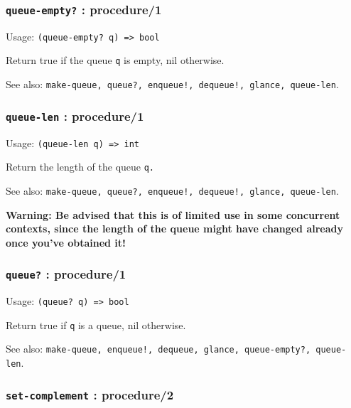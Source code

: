 \documentclass[
]{article}
\newcommand{\passthrough}[1]{#1}
\begin{document}
\hypertarget{queue-empty-procedure1}{%
\subsubsection{\texorpdfstring{\texttt{queue-empty?} :
procedure/1}{queue-empty? : procedure/1}}\label{queue-empty-procedure1}}

Usage: \passthrough{\lstinline!(queue-empty? q) => bool!}

Return true if the queue \passthrough{\lstinline!q!} is empty, nil
otherwise.

See also:
\passthrough{\lstinline"make-queue, queue?, enqueue!, dequeue!, glance, queue-len"}.

\hypertarget{queue-len-procedure1}{%
\subsubsection{\texorpdfstring{\texttt{queue-len} :
procedure/1}{queue-len : procedure/1}}\label{queue-len-procedure1}}

Usage: \passthrough{\lstinline!(queue-len q) => int!}

Return the length of the queue \passthrough{\lstinline!q.!}

See also:
\passthrough{\lstinline"make-queue, queue?, enqueue!, dequeue!, glance, queue-len"}.

\textbf{Warning: Be advised that this is of limited use in some
concurrent contexts, since the length of the queue might have changed
already once you've obtained it!}

\hypertarget{queue-procedure1}{%
\subsubsection{\texorpdfstring{\texttt{queue?} :
procedure/1}{queue? : procedure/1}}\label{queue-procedure1}}

Usage: \passthrough{\lstinline!(queue? q) => bool!}

Return true if \passthrough{\lstinline!q!} is a queue, nil otherwise.

See also:
\passthrough{\lstinline"make-queue, enqueue!, dequeue, glance, queue-empty?, queue-len"}.

\hypertarget{set-complement-procedure2}{%
\subsubsection{\texorpdfstring{\texttt{set-complement} :
procedure/2}{set-complement : procedure/2}}\label{set-complement-procedure2}}
\end{document}
